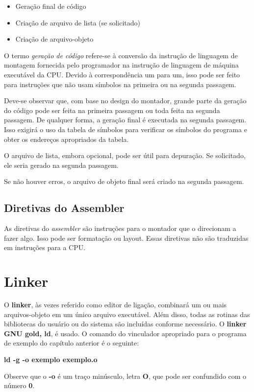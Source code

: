 \begin{itemize}
	\item Geração final de código
	\item Criação de arquivo de lista (se solicitado)
	\item Criação de arquivo-objeto
\end{itemize}

O termo \textit{geração de código} refere-se à conversão da instrução de linguagem de montagem fornecida pelo programador na instrução de linguagem de máquina executável da CPU. Devido à correspondência um para um, isso pode ser feito para instruções que não usam símbolos na primeira ou na segunda passagem.

Deve-se observar que, com base no design do montador, grande parte da geração do código pode ser feita na primeira passagem ou toda feita na segunda passagem. De qualquer forma, a geração final é executada na segunda passagem. Isso exigirá o uso da tabela de símbolos para verificar os símbolos do programa e obter os endereços apropriados da tabela.

O arquivo de lista, embora opcional, pode ser útil para depuração. Se solicitado, ele seria gerado na segunda passagem.

Se não houver erros, o arquivo de objeto final será criado na segunda passagem.

\subsection{Diretivas do Assembler}
As diretivas do \textit{assembler} são instruções para o montador que o direcionam a fazer algo. Isso pode ser formatação ou layout. Essas diretivas não são traduzidas em instruções para a CPU.

\section{Linker}
O \textbf{linker}, às vezes referido como editor de ligação, combinará um ou mais arquivos-objeto em um único arquivo executável. Além disso, todas as rotinas das bibliotecas do usuário ou do sistema são incluídas conforme necessário. O \textbf{linker GNU gold, ld}, é usado. O comando do vinculador apropriado para o programa de exemplo do capítulo anterior é o seguinte:
\begin{center}
	\textbf{ld -g -o exemplo exemplo.o}
\end{center}

Observe que o \textbf{-o} é um traço minúsculo, letra \textbf{O}, que pode ser confundido com o número \textbf{0}.


